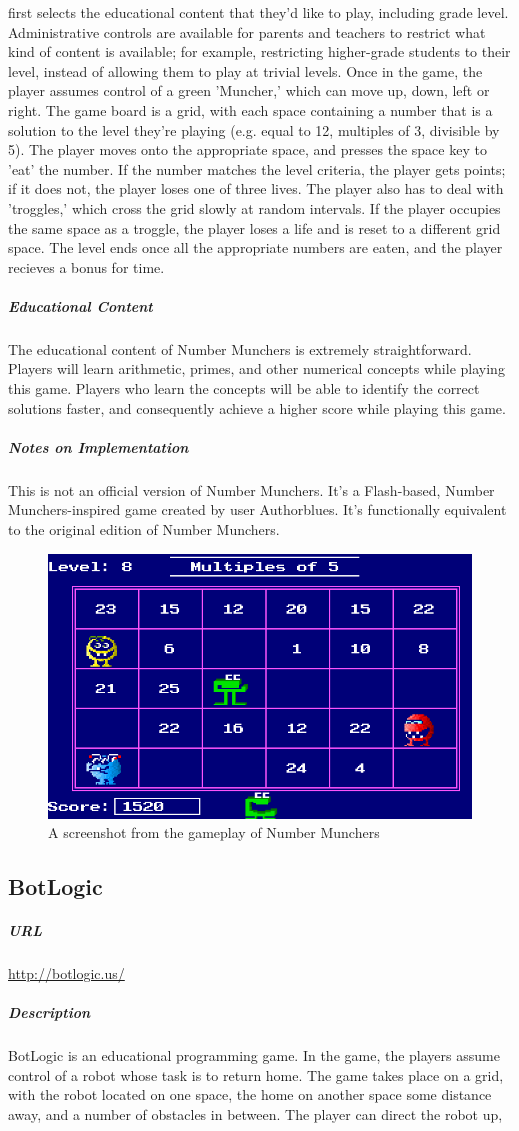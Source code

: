 first selects the educational content that they'd like to play, including grade level. Administrative controls are available for parents and teachers to restrict what kind of content is available; for example, restricting higher-grade students to their level, instead of allowing them to play at trivial levels. Once in the game, the player assumes control of a green 'Muncher,' which can move up, down, left or right. The game board is a grid, with each space containing a number that is a solution to the level they're playing (e.g. equal to 12, multiples of 3, divisible by 5). The player moves onto the appropriate space, and presses the space key to 'eat' the number. If the number matches the level criteria, the player gets points; if it does not, the player loses one of three lives. The player also has to deal with 'troggles,' which cross the grid slowly at random intervals. If the player occupies the same space as a troggle, the player loses a life and is reset to a different grid space. The level ends once all the appropriate numbers are eaten, and the player recieves a bonus for time.\subparagraph{Educational Content}The educational content of Number Munchers is extremely straightforward. Players will learn arithmetic, primes, and other numerical concepts while playing this game. Players who learn the concepts will be able to identify the correct solutions faster, and consequently achieve a higher score while playing this game.\subparagraph{Notes on Implementation}This is not an official version of Number Munchers. It's a Flash-based, Number Munchers-inspired game created by user Authorblues. It's functionally equivalent to the original edition of Number Munchers.\begin{figure}[p]\centering \includegraphics[height=.4\textheight, width=\textwidth, keepaspectratio=true]{img/munchers_screen.png}\caption{A screenshot from the gameplay of Number Munchers}\end{figure}\subsection{BotLogic}\subparagraph{URL}\url{http://botlogic.us/}\subparagraph{Description}BotLogic is an educational programming game. In the game, the players assume control of a robot whose task is to return home. The game takes place on a grid, with the robot located on one space, the home on another space some distance away, and a number of obstacles in between. The player can direct the robot up, 
